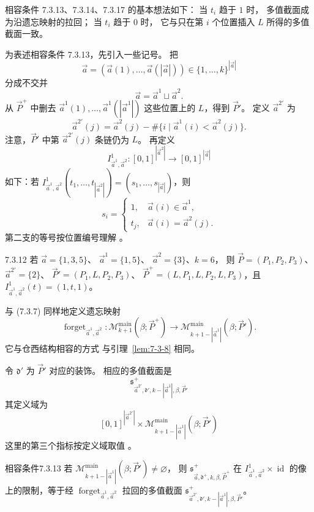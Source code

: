 
相容条件 7.3.13、7.3.14、7.3.17
的基本想法如下：
当 $t_i$ 趋于 $1$ 时，
多值截面成为沿遗忘映射的拉回；
当 $t_i$ 趋于 $0$ 时，
它与只在第 $i$ 个位置插入 $L$
所得的多值截面一致。

为表述相容条件 7.3.13，先引入一些记号。
把
\[
\vec a=(\vec a(1),\ldots,\vec a(|\vec a|))
\in\{1,\ldots,k\}^{|\vec a|}
\]
分成不交并
\[
\vec a=\vec a^1\sqcup\vec a^2.
\]
从 $\vec P^+$ 中删去
$\vec a^1(1),\ldots,
\vec a^1(|\vec a^1|)$
这些位置上的 $L$，得到 $\vec P'$。
定义 $\vec a^{2\prime}$ 为
\[
\vec a^{2\prime}(j)
=\vec a^2(j)
-\#\{i\mid\vec a^1(i)<\vec a^2(j)\}.
\]
注意，$\vec P'$ 中第
$\vec a^{2\prime}(j)$ 条链仍为 $L$。
再定义
\[
I^1_{\vec a^1,\vec a^2}\colon
[0,1]^{|\vec a^2|}\longrightarrow
[0,1]^{|\vec a|}
\]
如下：若
$I^1_{\vec a^1,\vec a^2}
(t_1,\ldots,t_{|\vec a^2|})
=(s_1,\ldots,s_{|\vec a|})$，则
\[
s_i=
\begin{cases}
1,&\vec a(i)\in\vec a^1,\\
t_j,&\vec a(i)=\vec a^2(j).
\end{cases}
\]
第二支的等号按位置编号理解
。

\begin{example}{7.3.12}\label{ex:7-3-12}
若 $\vec a=\{1,3,5\}$、
$\vec a^1=\{1,5\}$、
$\vec a^2=\{3\}$、$k=6$，
则 $\vec P=(P_1,P_2,P_3)$、
$\vec a^{2\prime}=\{2\}$、
$\vec P'=(P_1,L,P_2,P_3)$、
$\vec P^+=(L,P_1,L,P_2,L,P_3)$，且
$I^1_{\vec a^1,\vec a^2}(t)=(1,t,1)$。
\end{example}

与 (7.3.7) 同样地定义遗忘映射
\[
\operatorname{forget}_{\vec a^1,\vec a^2}\colon
\mathcal M^{\mathrm{main}}_{k+1}(\beta;\vec P^+)
\longrightarrow
\mathcal M^{\mathrm{main}}_{k+1-|\vec a^1|}
(\beta;\vec P').
\]
它与仓西结构相容的方式
与引理~\ref{lem:7-3-8} 相同。
\begin{samepage}
令 $\mathfrak d'$ 为 $\vec P'$ 对应的装饰。
相应的多值截面是
\[
\mathfrak s^+_{\vec a^{2\prime},\mathfrak d',
k-|\vec a^1|,\beta,\vec P'}
\]
其定义域为
\[
[0,1]^{|\vec a^{2\prime}|}\times
\mathcal M^{\mathrm{main}}_{k+1-|\vec a^1|}
(\beta;\vec P')
\]
这里的第三个指标按定义域取值
。
\end{samepage}

\begin{statement}{相容条件}{7.3.13}\label{cond:7-3-13}
%
若
$\mathcal M^{\mathrm{main}}_{k+1-|\vec a^1|}
(\beta;\vec P')\ne\varnothing$，
则 $\mathfrak s^+_{\vec a,\mathfrak d^+,
k,\beta,\vec P^+}$ 在
$I^1_{\vec a^1,\vec a^2}\times\operatorname{id}$
的像上的限制，等于经
$\operatorname{forget}_{\vec a^1,\vec a^2}$
拉回的多值截面
$\mathfrak s^+_{\vec a^{2\prime},\mathfrak d',
k-|\vec a^1|,\beta,\vec P'}$。
\end{statement}

